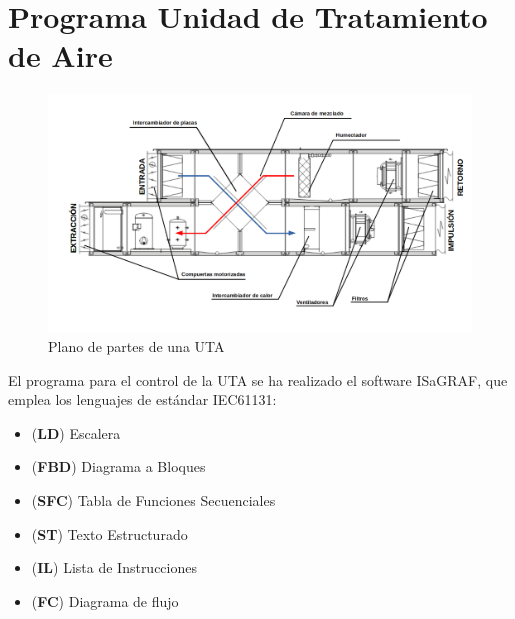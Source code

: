
\cleardoublepage
\chapter{Programa Unidad de Tratamiento de Aire}

\label{chap:anexoProgramaUTA} %

\begin{figure}[H]
    \centering
    \includegraphics[width=\textwidth, keepaspectratio]{img/esquemaUTA}
    \caption{Plano de partes de una UTA}
    \label{figura:sasssssd}
\end{figure}

El programa para el control de la UTA se ha realizado el software ISaGRAF, que emplea los lenguajes de estándar IEC61131:                   

\begin{itemize}
    \item (\textbf{LD}) Escalera  
    \item (\textbf{FBD}) Diagrama a Bloques 
    \item (\textbf{SFC}) Tabla de Funciones Secuenciales 
    \item (\textbf{ST}) Texto Estructurado 
    \item (\textbf{IL}) Lista de Instrucciones 
    \item (\textbf{FC}) Diagrama de flujo 
  \end{itemize}

